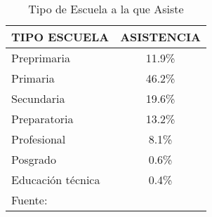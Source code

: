 \begin{table}[h]
    \centering
    \caption{Tipo de Escuela a la que Asiste}
    \label{tbl:EIGHG:tipo-escuela}
    \begin{tabular}{l|c}
        \multicolumn{1}{c|}{TIPO ESCUELA} & ASISTENCIA \\
        \hline
        \hline
        Preprimaria       & 11.9\%     \\
        Primaria          & 46.2\%     \\
        Secundaria        & 19.6\%     \\
        Preparatoria      & 13.2\%     \\
        Profesional       &  8.1\%     \\
        Posgrado          &  0.6\%     \\
        Educación técnica &  0.4\%     \\
        \hline
        \multicolumn{2}{l}{Fuente: \citep{INEGI-2009-DGES-003}}
    \end{tabular}
\end{table}

